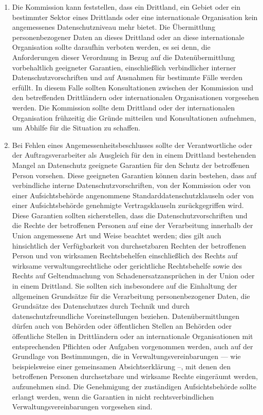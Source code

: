 \begin{enumerate}

   \item Die Kommission kann feststellen, dass ein Drittland, ein Gebiet oder ein bestimmter Sektor eines Drittlands
    oder eine internationale Organisation kein angemessenes Datenschutzniveau mehr bietet. Die Übermittlung
    personenbezogener Daten an dieses Drittland oder an diese internationale Organisation sollte daraufhin verboten
    werden, es sei denn, die Anforderungen dieser Verordnung in Bezug auf die Datenübermittlung vorbehaltlich
    geeigneter Garantien, einschließlich verbindlicher interner Datenschutzvorschriften und auf Ausnahmen für bestimmte
    Fälle werden erfüllt. In diesem Falle sollten Konsultationen zwischen der Kommission und den betreffenden
    Drittländern oder internationalen Organisationen vorgesehen werden. Die Kommission sollte dem Drittland oder der
    internationalen Organisation frühzeitig die Gründe mitteilen und Konsultationen aufnehmen, um Abhilfe für die
    Situation zu schaffen.%
   \label{itm:eg-107}
   

   \item Bei Fehlen eines Angemessenheitsbeschlusses sollte der Verantwortliche oder der Auftragsverarbeiter als
    Ausgleich für den in einem Drittland bestehenden Mangel an Datenschutz geeignete Garantien für den Schutz der
    betroffenen Person vorsehen. Diese geeigneten Garantien können darin bestehen, dass auf verbindliche interne
    Datenschutzvorschriften, von der Kommission oder von einer Aufsichtsbehörde angenommene Standarddatenschutzklauseln
    oder von einer Aufsichtsbehörde genehmigte Vertragsklauseln zurückgegriffen wird. Diese Garantien sollten
    sicherstellen, dass die Datenschutzvorschriften und die Rechte der betroffenen Personen auf eine der Verarbeitung
    innerhalb der Union angemessene Art und Weise beachtet werden; dies gilt auch hinsichtlich der Verfügbarkeit von
    durchsetzbaren Rechten der betroffenen Person und von wirksamen Rechtsbehelfen einschließlich des Rechts auf
    wirksame verwaltungsrechtliche oder gerichtliche Rechtsbehelfe sowie des Rechts auf Geltendmachung von
    Schadenersatzansprüchen in der Union oder in einem Drittland. Sie sollten sich insbesondere auf die Einhaltung der
    allgemeinen Grundsätze für die Verarbeitung personenbezogener Daten, die Grundsätze des Datenschutzes durch Technik
    und durch datenschutzfreundliche Voreinstellungen beziehen. Datenübermittlungen dürfen auch von Behörden oder
    öffentlichen Stellen an Behörden oder öffentliche Stellen in Drittländern oder an internationale Organisationen mit
    entsprechenden Pflichten oder Aufgaben vorgenommen werden, auch auf der Grundlage von Bestimmungen, die in
    Verwaltungsvereinbarungen — wie beispielsweise einer gemeinsamen Absichtserklärung –, mit denen den betroffenen
    Personen durchsetzbare und wirksame Rechte eingeräumt werden, aufzunehmen sind. Die Genehmigung der zuständigen
    Aufsichtsbehörde sollte erlangt werden, wenn die Garantien in nicht rechtsverbindlichen Verwaltungsvereinbarungen
    vorgesehen sind.%
   \label{itm:eg-108}
   

\end{enumerate}
